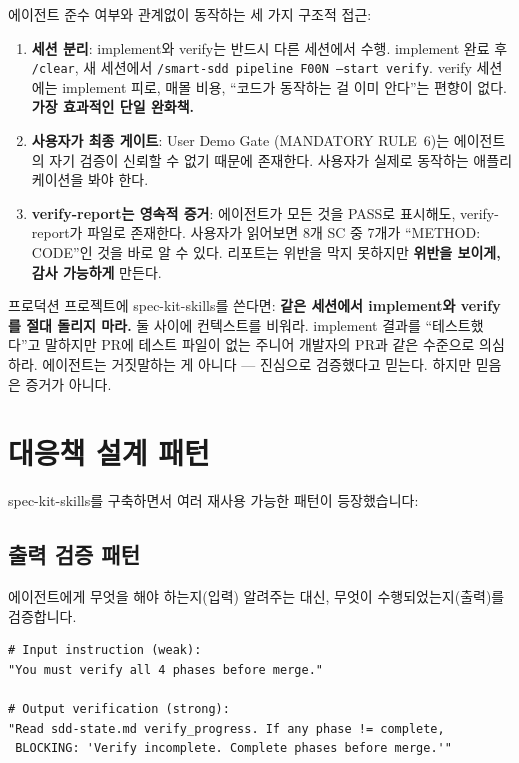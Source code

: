 \documentclass[11pt,a4paper,openright,twoside]{report}
\begin{document}
에이전트 준수 여부와 관계없이 동작하는 세 가지 구조적 접근:

\begin{enumerate}
  \item \textbf{세션 분리}: implement와 verify는 반드시 다른 세션에서 수행. implement 완료 후 \texttt{/clear}, 새 세션에서 \texttt{/smart-sdd pipeline F00N --start verify}. verify 세션에는 implement 피로, 매몰 비용, ``코드가 동작하는 걸 이미 안다''는 편향이 없다. \textbf{가장 효과적인 단일 완화책.}

  \item \textbf{사용자가 최종 게이트}: User Demo Gate (MANDATORY RULE~6)는 에이전트의 자기 검증이 신뢰할 수 없기 때문에 존재한다. 사용자가 실제로 동작하는 애플리케이션을 봐야 한다.

  \item \textbf{verify-report는 영속적 증거}: 에이전트가 모든 것을 PASS로 표시해도, verify-report가 파일로 존재한다. 사용자가 읽어보면 8개 SC 중 7개가 ``METHOD: CODE''인 것을 바로 알 수 있다. 리포트는 위반을 막지 못하지만 \textbf{위반을 보이게, 감사 가능하게} 만든다.
\end{enumerate}

\begin{tipbox}[솔직한 권고]
프로덕션 프로젝트에 spec-kit-skills를 쓴다면: \textbf{같은 세션에서 implement와 verify를 절대 돌리지 마라.} 둘 사이에 컨텍스트를 비워라. implement 결과를 ``테스트했다''고 말하지만 PR에 테스트 파일이 없는 주니어 개발자의 PR과 같은 수준으로 의심하라. 에이전트는 거짓말하는 게 아니다 --- 진심으로 검증했다고 믿는다. 하지만 믿음은 증거가 아니다.
\end{tipbox}


\section{대응책 설계 패턴}

spec-kit-skills를 구축하면서 여러 재사용 가능한 패턴이 등장했습니다:

\subsection{출력 검증 패턴}

에이전트에게 무엇을 해야 하는지(입력) 알려주는 대신, 무엇이 수행되었는지(출력)를 검증합니다.

\begin{lstlisting}[title={Output Verification Example}]
# Input instruction (weak):
"You must verify all 4 phases before merge."

# Output verification (strong):
"Read sdd-state.md verify_progress. If any phase != complete,
 BLOCKING: 'Verify incomplete. Complete phases before merge.'"
\end{lstlisting}
\end{document}
